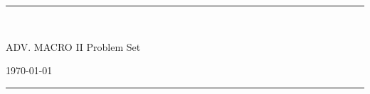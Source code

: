 \fancyhead[C]{}
\hrule \medskip
\begin{minipage}{0.295\textwidth} 
\raggedright
\footnotesize
\yourname \hfill\\ 
\youremail
\end{minipage}
\begin{minipage}{0.4\textwidth} 
\centering 
\large 
ADV. MACRO II %
\normalsize 
Problem Set \deliverynumber\\ 
\end{minipage}
\begin{minipage}{0.295\textwidth} 
\raggedleft
\today\hfill\\
\end{minipage}
\medskip\hrule 
\bigskip
